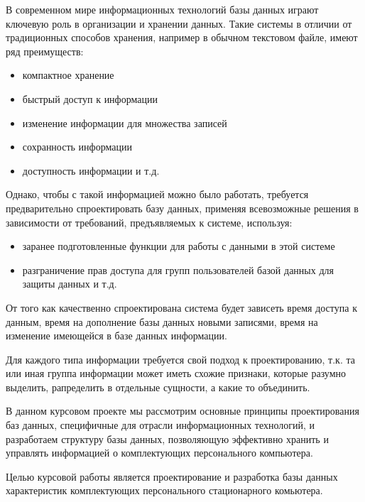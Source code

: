 
В современном мире информационных технологий базы данных играют ключевую роль в организации и хранении данных. Такие системы в отличии от традиционных способов хранения, например в обычном текстовом файле, имеют ряд преимуществ: 
\begin{itemize}
  \item 
  компактное хранение
  \item 
  быстрый доступ к информации
  \item 
  изменение информации для множества записей
  \item 
  сохранность информации
  \item 
  доступность информации
  и т.д.
\end{itemize}
Однако, чтобы с такой информацией можно было работать, требуется предварительно спроектировать базу данных, применяя всевозможные решения в зависимости от требований, предъявляемых к системе, используя:
\begin{itemize}
  \item 
  заранее подготовленные функции для работы с данными в этой системе
  \item 
  разграничение прав доступа для групп пользователей базой данных для защиты данных
  и т.д.
\end{itemize}

От того как качественно спроектирована система будет зависеть время доступа к данным, время на дополнение базы данных новыми записями, время на изменение имеющейся в базе данных информации.

Для каждого типа информации требуется свой подход к проектированию, т.к. та или иная группа информации может иметь схожие признаки, которые разумно выделить, рапределить в отдельные сущности, а какие то объединить.

В данном курсовом проекте мы рассмотрим основные принципы проектирования баз данных, специфичные для отрасли информационных технологий, и разработаем структуру базы данных, позволяющую эффективно хранить и управлять информацией о комплектующих персонального компьютера.

Целью курсовой работы является проектирование и разработка базы данных характеристик комплектующих персонального стационарного комьютера.
